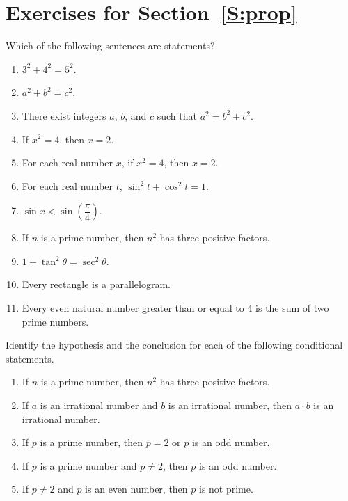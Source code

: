 \section*{Exercises for Section~\ref{S:prop}}
\begin{enumerate}
  \xitem Which of the following sentences are statements? \label{exer:sec11-1}%
  \begin{enumerate}
  \item $3^2  + 4^2  = 5^2$.

  \item $a^2  + b^2  = c^2$. 
  \item There exist integers $a$, $b$, and $c$ such that $a^2 = b^2 + c^2$.

  \item If  $x^2  = 4$, then  $x = 2$.
  \item For each real number $x$, if $x^2 = 4$, then $x = 2$.

  \item For each real number  $t$,  $\sin ^2 t + \cos ^2 t = 1$.

  \item $\sin x < \sin \! \left( {\dfrac{\pi }{4}} \right)$.

  \item If  $n$  is a prime number, then  $n^2$ has three positive factors.

  \item $1 + \tan ^2 \theta  = \sec ^2 \theta $.

  \item Every rectangle is a parallelogram.
  \item Every even natural number greater than or equal to 4 is the sum of two prime numbers.
  \end{enumerate}

\xitem \label{exer:sec11-2}%
Identify the hypothesis and the conclusion for each of the following conditional statements. 
  \begin{enumerate}
  \item If  $n$  is a prime number, then  $n^2$ has three positive factors.
  \item If  $a$  is an irrational number and  $b$  is an irrational number, then  $a \cdot b$ is an irrational number.
  \item If  $p$  is a prime number, then  $p = 2$ or   $p$ is an odd number.
  \item If $p$ is a prime number and $p \ne 2$, then $p$ is an odd number.
  \item If $p \ne 2$ and $p$ is an even number, then $p$ is not prime.
  \end{enumerate}


\end{enumerate}
